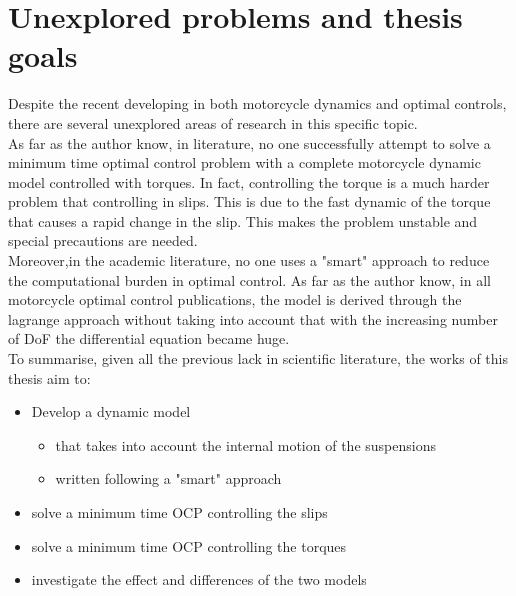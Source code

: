 \section{Unexplored problems and thesis goals}
%
Despite the recent developing in both motorcycle dynamics and optimal controls, there are several unexplored areas of research in this specific topic.\\
As far as the author know, in literature, no one successfully attempt to solve a minimum time optimal control problem with a complete motorcycle dynamic model controlled with torques. In fact, controlling the torque is a much harder problem that controlling in slips. This is due to the fast dynamic of the torque that causes a rapid change in the slip. This makes the problem unstable and special precautions are needed.\\
Moreover,in the academic literature, no one uses a "smart" approach to reduce the computational burden in optimal control. As far as the author know, in all motorcycle optimal control publications, the model is derived through the lagrange approach without taking into account that with the increasing number of DoF the differential equation became huge.\\
To summarise, given all the previous lack in scientific literature, the works of this thesis aim to:
%
\begin{itemize}
    \setlength{\itemsep}{0pt}
    \item Develop a dynamic model 
    \begin{itemize}
        \setlength{\itemsep}{0pt}
        \item that takes into account the internal motion of the suspensions
        \item written following a "smart" approach
    \end{itemize}
    \item solve a minimum time OCP controlling the slips
    \item solve a minimum time OCP controlling the torques
    \item investigate the effect and differences of the two models
\end{itemize} 
%